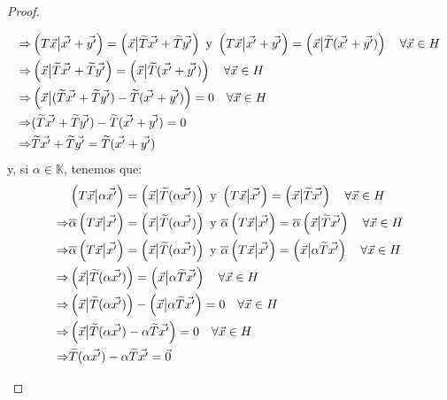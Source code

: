 \documentclass[12pt]{report}
\newcounter{it}
\theoremstyle{largebreak}
\newcommand\adj[1]{\ensuremath{\widetilde{#1}}}
\newcommand\pint[2]{\ensuremath{\left(#1\big|#2\right)}}
\newcommand\conj[1]{\ensuremath{\overline{#1}}}
\begin{document}
\begin{proof}
\begin{itemize}
\begin{equation*}
\begin{split}
                    \Rightarrow& \pint{T\vec{x}}{\vec{x'}+\vec{y'}}=\pint{\vec{x}}{\adj{T}\vec{x'}+\adj{T}\vec{y'}}\textup{ y }\pint{T\vec{x}}{\vec{x'}+\vec{y'}}=\pint{\vec{x}}{\adj{T}(\vec{x'}+\vec{y'})}\quad\forall\vec{x}\in H\\
                    \Rightarrow& \pint{\vec{x}}{\adj{T}\vec{x'}+\adj{T}\vec{y'}}=\pint{\vec{x}}{\adj{T}(\vec{x'}+\vec{y'})}\quad\forall\vec{x}\in H\\
                    \Rightarrow& \pint{\vec{x}}{(\adj{T}\vec{x'}+\adj{T}\vec{y'})-\adj{T}(\vec{x'}+\vec{y'})}=0\quad\forall\vec{x}\in H\\
                    \Rightarrow& (\adj{T}\vec{x'}+\adj{T}\vec{y'})-\adj{T}(\vec{x'}+\vec{y'})=0\\
                    \Rightarrow& \adj{T}\vec{x'}+\adj{T}\vec{y'}=\adj{T}(\vec{x'}+\vec{y'})\\
                \end{split}
            \end{equation*}
            y, si $\alpha\in\mathbb{K}$, tenemos que:
            \begin{equation*}
                \begin{split}
                    &\pint{T\vec{x}}{\alpha\vec{x'}}=\pint{\vec{x}}{\adj{T}(\alpha\vec{x'})}\textup{ y }\pint{T\vec{x}}{\vec{x'}}=\pint{\vec{x}}{\adj{T}\vec{x'}}\quad\forall\vec{x}\in H\\
                    \Rightarrow&\conj{\alpha} \pint{T\vec{x}}{\vec{x'}}=\pint{\vec{x}}{\adj{T}(\alpha\vec{x'})}\textup{ y }\conj{\alpha}\pint{T\vec{x}}{\vec{x'}}=\conj{\alpha}\pint{\vec{x}}{\adj{T}\vec{x'}}\quad\forall\vec{x}\in H\\
                    \Rightarrow&\conj{\alpha} \pint{T\vec{x}}{\vec{x'}}=\pint{\vec{x}}{\adj{T}(\alpha\vec{x'})}\textup{ y }\conj{\alpha}\pint{T\vec{x}}{\vec{x'}}=\pint{\vec{x}}{\alpha\adj{T}\vec{x'}}\quad\forall\vec{x}\in H\\
                    \Rightarrow&\pint{\vec{x}}{\adj{T}(\alpha\vec{x'})}=\pint{\vec{x}}{\alpha\adj{T}\vec{x'}}\quad\forall\vec{x}\in H\\
                    \Rightarrow&\pint{\vec{x}}{\adj{T}(\alpha\vec{x'})}-\pint{\vec{x}}{\alpha\adj{T}\vec{x'}}=0\quad\forall\vec{x}\in H\\
                    \Rightarrow&\pint{\vec{x}}{\adj{T}(\alpha\vec{x'})-\alpha\adj{T}\vec{x'}}=0\quad\forall\vec{x}\in H\\
                    \Rightarrow&\adj{T}(\alpha\vec{x'})-\alpha\adj{T}\vec{x'}=\vec{0}\\

\end{split}
\end{equation*}
\end{itemize}
\end{proof}
\end{document}
